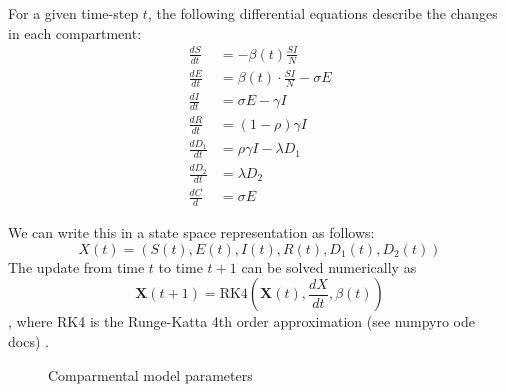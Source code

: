 \documentclass[11pt]{amsart}
\begin{document}
For a given time-step $t$, the following differential equations describe the changes in each compartment:
$$\begin{aligned} 
\frac{dS}{dt} &= - \beta(t) \frac{SI}{N} \\
\frac{dE}{dt} &= \beta(t) \cdot \frac{SI}{N} - \sigma E \\
\frac{dI}{dt} &= \sigma E - \gamma I\\ 
\frac{dR}{dt} &= (1-\rho)\gamma I \\
\frac{dD_1}{dt} &= \rho \gamma I - \lambda D_1\\
\frac{dD_2}{dt} &= \lambda D_2\\
\frac{dC}{d} &= \sigma E
\end{aligned} $$


We can write this in a state space representation as follows: \[
X(t) = (S(t), E(t), I(t), R(t), D_1(t), D_2(t))
\]
The update from time $t$ to time $t+1$ can be solved numerically as
$$\bm{X}(t+1)= \text{RK4}\left(\bm{X}(t),\frac{dX}{dt},\beta(t)\right)$$,
where RK4 is the Runge-Katta 4th order approximation (see numpyro ode docs) \cite{numpyro}.


\begin{figure}
 \begin{center}
\end{center}
      \caption{Comparmental model parameters }
     \label{fig:seird}
 \end{figure}
 
\end{document}
